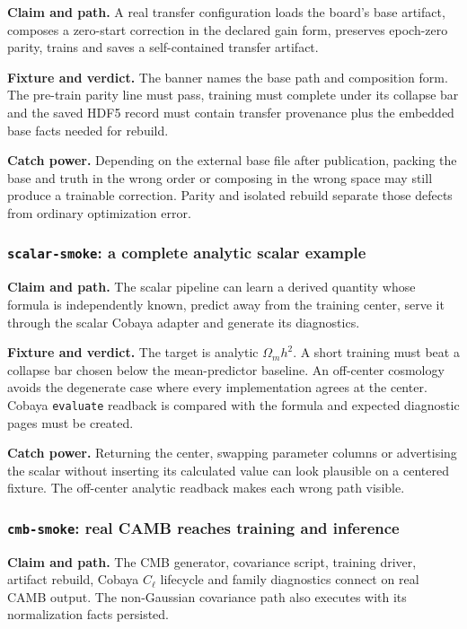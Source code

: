 \documentclass[10pt,aps,prd,twocolumn,nofootinbib]{revtex4-2}
\newcommand{\code}[1]{\texttt{#1}}
\begin{document}
\textbf{Claim and path.}  A real transfer configuration loads the board's base
artifact, composes a zero-start correction in the declared gain form,
preserves epoch-zero parity, trains and saves a self-contained transfer
artifact.

\textbf{Fixture and verdict.}  The banner names the base path and composition
form.  The pre-train parity line must pass, training must complete under its
collapse bar and the saved HDF5 record must contain transfer provenance plus
the embedded base facts needed for rebuild.

\textbf{Catch power.}  Depending on the external base file after publication,
packing the base and truth in the wrong order or composing in the wrong
space may still produce a trainable correction.  Parity and isolated rebuild
separate those defects from ordinary optimization error.

\subsubsection{\code{scalar-smoke}: a complete analytic scalar example}

\textbf{Claim and path.}  The scalar pipeline can learn a derived quantity
whose formula is independently known, predict away from the training center,
serve it through the scalar Cobaya adapter and generate its diagnostics.

\textbf{Fixture and verdict.}  The target is analytic
\(\Omega_m h^2\).  A short training must beat a collapse bar chosen below the
mean-predictor baseline.  An off-center cosmology avoids the degenerate case
where every implementation agrees at the center.  Cobaya
\code{evaluate} readback is compared with the formula and expected diagnostic
pages must be created.

\textbf{Catch power.}  Returning the center, swapping parameter columns or
advertising the scalar without inserting its calculated value can look
plausible on a centered fixture.  The off-center analytic readback makes each
wrong path visible.

\subsubsection{\code{cmb-smoke}: real CAMB reaches training and inference}

\textbf{Claim and path.}  The CMB generator, covariance script, training
driver, artifact rebuild, Cobaya \(C_\ell\) lifecycle and family diagnostics
connect on real CAMB output.  The non-Gaussian covariance path also executes
with its normalization facts persisted.
\end{document}
